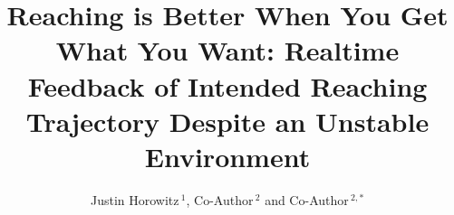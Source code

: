 \documentclass{frontiersSCNS} %
\def\firstAuthorLast{Horowitz {et~al.}} %
\def\Authors{Justin Horowitz\,$^1$, Co-Author\,$^{2}$ and Co-Author\,$^{2,*}$}
\begin{document}
\onecolumn
{}

\title[Realtime Feedback of Intended Trajectory]{Reaching is Better When You Get What You Want: Realtime Feedback of Intended Reaching Trajectory Despite an Unstable Environment}
\author[\firstAuthorLast ]{\Authors}
\address{}
\correspondance{}
\extraAuth{}%
\topic{}%

\maketitle

\end{document}

